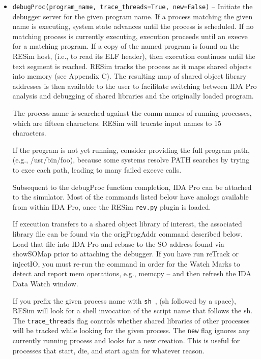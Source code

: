 \documentclass[titlepage]{article}
\begin{document}
\begin{itemize}

\item {\tt debugProc(program\_name, trace\_threads=True, new=False)} – Initiate the debugger server for the given program name.  If a process matching the given name is executing, system state advances until the process is scheduled.  If no matching process is currently executing, execution proceeds until an execve for a matching program.   If a copy of the named program is found on the RESim host, (i.e., to read its ELF header), then execution continues until the text segment is reached.  RESim tracks the process as it maps shared objects into memory (see Appendix C).  The resulting map of shared object library addresses is then available to the user to facilitate switching between IDA Pro analysis and debugging of shared libraries and the originally loaded program.

The process name is searched against the comm names of running processes, which are fifteen characters.  RESim will trucate input names to 15 characters.

If the program is not yet running, consider providing the full program path, (e.g., /usr/bin/foo), because some systems resolve PATH searches by trying
to exec each path, leading to many failed execve calls.

Subsequent to the debugProc  function completion, IDA Pro can be attached to the simulator.  Most of the commands listed below have analogs available from within IDA Pro, once the RESim {\tt rev.py} plugin is loaded.

If execution transfers to a shared object library of interest, the associated library file can be found via the origProgAddr command described below.  Load that file into IDA Pro and rebase to the SO address
found via showSOMap prior to attaching the debugger.  If you have run reTrack or injectIO, you must re-run the command in order for the Watch Marks to 
detect and report mem operations, e.g., memcpy -- and then refresh the IDA Data Watch window. 

If you prefix the given process name with {\tt sh }, (sh followed by a space), RESim will look for a shell invocation of the script name that follows the sh.
The {\tt trace\_threads} flag controls whether shared libraries of other processes will be tracked while looking for the given process.  The {\tt new} flag ignores any currently 
running process and looks for a new creation.  This is useful for processes that start, die, and start again for whatever reason.


\end{itemize}
\end{document}
